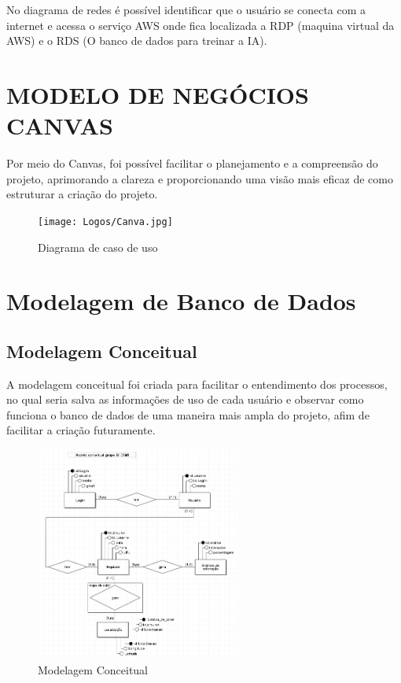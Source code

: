 \documentclass[
  a4paper,%
  12pt,%
  english,%
  brazilian,%
]{article}
\begin{document}
        \newpage

        No diagrama de redes é possível identificar que o usuário se conecta com a internet e acessa o serviço AWS onde fica localizada a RDP (maquina virtual da AWS) e o RDS (O banco de dados para treinar a IA).

        \section*{MODELO DE NEGÓCIOS CANVAS}

        Por meio do Canvas, foi possível facilitar o planejamento e a compreensão do projeto, aprimorando a clareza e proporcionando uma visão mais eficaz de como estruturar a criação do projeto.

        \begin{figure}[h]
            \centering
            \caption{Diagrama de caso de uso}%
            \label{fig:canvas}
             \texttt{[image: Logos/Canva.jpg]}
            \end{figure}

            \newpage

            \section*{Modelagem de Banco de Dados}
    

            \subsection*{Modelagem Conceitual}
            A modelagem conceitual foi criada para facilitar o entendimento dos processos, no qual seria salva as informações de uso de cada usuário e observar como funciona o banco de dados de uma maneira mais ampla do projeto, afim de facilitar a criação futuramente.

                \begin{figure}[h]
                \centering
                \caption{Modelagem Conceitual}%
                \label{fig:mod-conceitual}
                 \includegraphics[width=0.6\textwidth]{Logos/BDC.jpeg}
                \end{figure}
\end{document}
